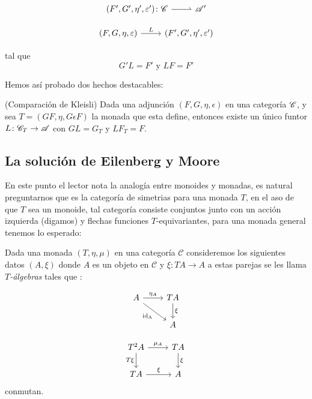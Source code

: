 \documentclass{comunicaciones}
\begin{document}
\[\begin{tikzcd}
	{(F',G',\eta',\varepsilon')\colon\mathcal{C}} & {\mathcal{A}'}
	\arrow[harpoon, from=1-1, to=1-2]
\end{tikzcd}\]


\[\begin{tikzcd}
	{(F,G,\eta,\varepsilon)} \ar[r, "L"] &  {(F',G',\eta',\varepsilon')}
\end{tikzcd}\]

tal que \[G'L=F'\text{ y } LF=F'\]



Hemos así probado dos hechos destacables:

\begin{thm}(Comparación de Kleisli)\label{kleisli es final}
Dada una adjunción $(F,G,\eta,\epsilon)$ en una categoría $\EuScript{C}$, y sea $T=(GF, \eta,G\epsilon F)$ la monada que esta define,
entonces existe un único funtor $L\colon\mathscr{C}_{T}\rightarrow\EuScript{A}$ con $GL=G_{T}$ y $LF_{T}=F$.
\end{thm}



\subsection{La solución de Eilenberg y Moore}\label{EMSOL}

En este punto el lector nota la analogía entre monoides y monadas, es natural preguntarnos que es la categoría de simetrias para una monada $T$, en el aso de que $T$ sea un monoide,
tal categoría consiste conjuntos junto con un acción izquierda (digamos) y flechas funciones $T$-equivariantes, para una monada general tenemos lo esperado:


Dada una monada $(T,\eta,\mu)$ en una categoría $\mathcal{C}$ consideremos los siguientes datos $(A,\xi)$ donde $A$ es un objeto en $\mathcal{C}$ y $\xi\colon TA\rightarrow A$ 
a estas parejas se les llama $T$\emph{-álgebras}  tales que : 


\[\begin{tikzcd}
A\ar[r, "\eta_{A}"]\ar[dr,"{\rm id_{A}}"'] & TA\ar[d,"\xi"] \\
&  A
\end{tikzcd}\]



\[\begin{tikzcd}
    T^{2}A\ar[r, "\mu_{A}"]\ar[d,"T\xi"'] & TA\ar[d,"\xi"] \\
    TA\ar[r,"\xi"] &  A
    \end{tikzcd}\]
conmutan.
\end{document}
